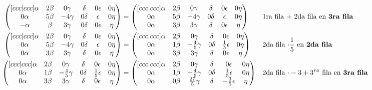 \documentclass[letterpaper]{article}
\renewcommand{\*}{\cdot}
\theoremstyle{definition}
\begin{document}
	\begin{align*}
		 \begin{pmatrix}[ccc|ccc]
		 \alpha & 2\beta & 0\gamma & \delta & 0\epsilon & 0\eta\\
		 0\alpha & 5\beta & -4\gamma& 0\delta & \epsilon & 0\eta\\
		 -\alpha & \beta & 3\gamma & 0\delta & 0\epsilon & \eta
		 \end{pmatrix} &= 		 \begin{pmatrix}[ccc|ccc]
		 \alpha & 2\beta & 0\gamma & \delta & 0\epsilon & 0\eta\\
		 0\alpha & 5\beta & -4\gamma& 0\delta & \epsilon & 0\eta\\
		 0\alpha & 3\beta & 3\gamma & \delta & 0\epsilon & \eta
		 \end{pmatrix} && \text{1ra fila + 2da fila en \textbf{3ra fila}} \\
		 \begin{pmatrix}[ccc|ccc]
		 \alpha & 2\beta & 0\gamma & \delta & 0\epsilon & 0\eta\\
		 0\alpha & 5\beta & -4\gamma& 0\delta & \epsilon & 0\eta\\
		 0\alpha & 3\beta & 3\gamma & \delta & 0\epsilon & \eta
		 \end{pmatrix} &= \begin{pmatrix}[ccc|ccc]
		 \alpha & 2\beta & 0\gamma & \delta & 0\epsilon & 0\eta\\
		 0\alpha & 1\beta & -\frac{4}{5}\gamma& 0\delta & \frac{1}{5}\epsilon & 0\eta\\
		 0\alpha & 3\beta & 3\gamma & \delta & 0\epsilon & \eta
		 \end{pmatrix} && \text{2da fila $ \* \frac{1}{5} $ en \textbf{2da fila}}\\
		 \begin{pmatrix}[ccc|ccc]
		 \alpha & 2\beta & 0\gamma & \delta & 0\epsilon & 0\eta\\
		 0\alpha & 1\beta & -\frac{4}{5}\gamma& 0\delta & \frac{1}{5}\epsilon & 0\eta\\
		 0\alpha & 3\beta & 3\gamma & \delta & 0\epsilon & \eta
		 \end{pmatrix} &= \begin{pmatrix}[ccc|ccc]
		 \alpha & 2\beta & 0\gamma & \delta & 0\epsilon & 0\eta\\
		 0\alpha & 1\beta & -\frac{4}{5}\gamma& 0\delta & \frac{1}{5}\epsilon & 0\eta\\
		 0\alpha & 0\beta & \frac{27}{5}\gamma & \delta & -\frac{3}{5}\epsilon & \eta
		 \end{pmatrix} && \text{2da fila $ \* -3  +  3^{ra}$ fila en \textbf{3ra fila}}\\

\end{align*}
\end{document}
